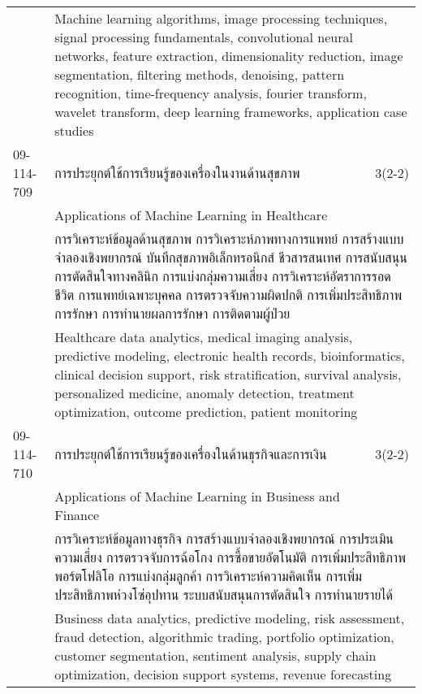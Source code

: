 \begin{longtable}{p{}p{}r{}}
&  \multicolumn{2}{p{0.75\textwidth}}{Machine learning algorithms, image processing techniques, signal processing fundamentals, convolutional neural networks, feature extraction, dimensionality reduction, image segmentation, filtering methods, denoising, pattern recognition, time-frequency analysis, fourier transform, wavelet transform, deep learning frameworks, application case studies} \vspace{8mm} \\*
09-114-709 & การประยุกต์ใช้การเรียนรู้ของเครื่องในงานด้านสุขภาพ  & 3(2-2)\\*
 & Applications of Machine Learning in Healthcare & \phantom{x} \vspace{3mm} \\*
&  \multicolumn{2}{p{0.75\textwidth}}{การวิเคราะห์ข้อมูลด้านสุขภาพ  การวิเคราะห์ภาพทางการแพทย์  การสร้างแบบจำลองเชิงพยากรณ์  บันทึกสุขภาพอิเล็กทรอนิกส์  ชีวสารสนเทศ  การสนับสนุนการตัดสินใจทางคลินิก  การแบ่งกลุ่มความเสี่ยง  การวิเคราะห์อัตราการรอดชีวิต  การแพทย์เฉพาะบุคคล  การตรวจจับความผิดปกติ  การเพิ่มประสิทธิภาพการรักษา  การทำนายผลการรักษา  การติดตามผู้ป่วย} \vspace{3mm} \\*
&  \multicolumn{2}{p{0.75\textwidth}}{Healthcare data analytics, medical imaging analysis, predictive modeling, electronic health records, bioinformatics, clinical decision support, risk stratification, survival analysis, personalized medicine, anomaly detection, treatment optimization, outcome prediction, patient monitoring} \vspace{8mm} \\*
09-114-710 & การประยุกต์ใช้การเรียนรู้ของเครื่องในด้านธุรกิจและการเงิน & 3(2-2)\\*
 & Applications of Machine Learning in Business and Finance & \phantom{x} \vspace{3mm} \\*
&  \multicolumn{2}{p{0.75\textwidth}}{การวิเคราะห์ข้อมูลทางธุรกิจ  การสร้างแบบจำลองเชิงพยากรณ์  การประเมินความเสี่ยง  การตรวจจับการฉ้อโกง  การซื้อขายอัตโนมัติ  การเพิ่มประสิทธิภาพพอร์ตโฟลิโอ  การแบ่งกลุ่มลูกค้า  การวิเคราะห์ความคิดเห็น  การเพิ่มประสิทธิภาพห่วงโซ่อุปทาน  ระบบสนับสนุนการตัดสินใจ  การทำนายรายได้} \vspace{3mm} \\*
&  \multicolumn{2}{p{0.75\textwidth}}{Business data analytics, predictive modeling, risk assessment, fraud detection, algorithmic trading, portfolio optimization, customer segmentation, sentiment analysis, supply chain optimization, decision support systems, revenue forecasting} \vspace{8mm} \\*

\end{longtable}
